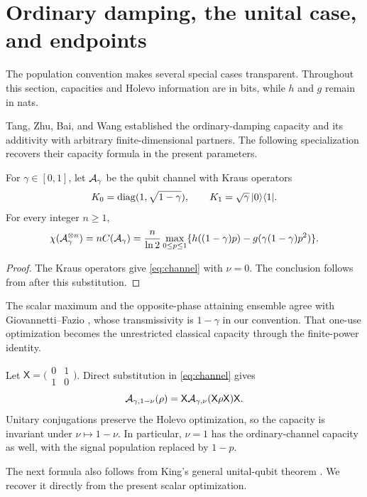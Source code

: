 \section{Ordinary damping, the unital case, and endpoints}
\label{sec:special}

The population convention makes several special cases transparent.
Throughout this section, capacities and Holevo information are in bits,
while $h$ and $g$ remain in nats.

Tang, Zhu, Bai, and Wang
\cite[Corollary~5.1 and Theorem~5.5]{TangEtAl2026} established the
ordinary-damping capacity and its additivity with arbitrary
finite-dimensional partners. The following specialization recovers
their capacity formula in the present parameters.

\begin{corollary}\label{cor:ordinary}
For $\gamma\in[0,1]$, let $\mathcal A_\gamma$ be the qubit channel with Kraus
operators
\[
 K_0=\operatorname{diag}(1,\sqrt{1-\gamma}),\qquad
 K_1=\sqrt\gamma\,\lvert 0\rangle\langle 1\rvert.
\]
For every integer $n\ge1$,
\[
 \chi(\mathcal A_\gamma^{\otimes n})=n C(\mathcal A_\gamma)
 =\frac n{\ln2}\max_{0\le p\le1}
 \{h((1-\gamma)p)-g(\gamma(1-\gamma)p^2)\}.
\]
\end{corollary}
\begin{proof}
The Kraus operators give \eqref{eq:channel} with $\nu=0$.
The conclusion follows from  after this substitution.
\end{proof}

The scalar maximum and the opposite-phase attaining ensemble agree
with Giovannetti--Fazio
\cite[Section~III~A, Eqs.~(42)--(43)]{GiovannettiFazio2005}, whose
transmissivity is $1-\gamma$ in our convention. That one-use
optimization becomes the unrestricted classical capacity through the
finite-power identity.

Let $\mathsf X=\bigl(\begin{smallmatrix}0&1\\1&0\end{smallmatrix}\bigr)$.
Direct substitution in \eqref{eq:channel} gives
\[
 \mathcal A_{\gamma,1-\nu}(\rho)
 =\mathsf X\mathcal A_{\gamma,\nu}(\mathsf X\rho\mathsf X)\mathsf X.
\]
Unitary conjugations preserve the Holevo optimization, so the capacity
is invariant under $\nu\mapsto1-\nu$. In particular, $\nu=1$ has the
ordinary-channel capacity as well, with the signal population replaced
by $1-p$.

The next formula also follows from King's general unital-qubit theorem
\cite{King2002}. We recover it directly from the present scalar
optimization.

